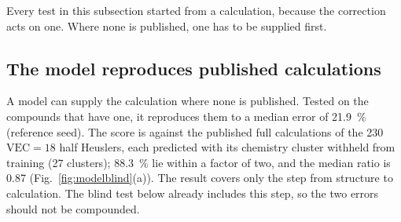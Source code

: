 Every test in this subsection started from a calculation, because the correction acts on one. Where
none is published, one has to be supplied first.

\subsection{The model reproduces published calculations}
\label{sec:mlrepro}

A model can supply the calculation where none is published. Tested on the compounds that have one,
it reproduces them to a median error of \SI{21.9}{\percent} (reference seed). The score is against
the published full calculations of the \num{230} $\mathrm{VEC}=18$ half Heuslers, each predicted
with its chemistry cluster withheld from training (\num{27} clusters); \SI{88.3}{\percent}
lie within a factor of two, and the median ratio is \num{0.87} (Fig.~\ref{fig:modelblind}(a)). The
result covers only the step from structure to calculation. The blind test below already
includes this step, so the two errors should not be compounded.

